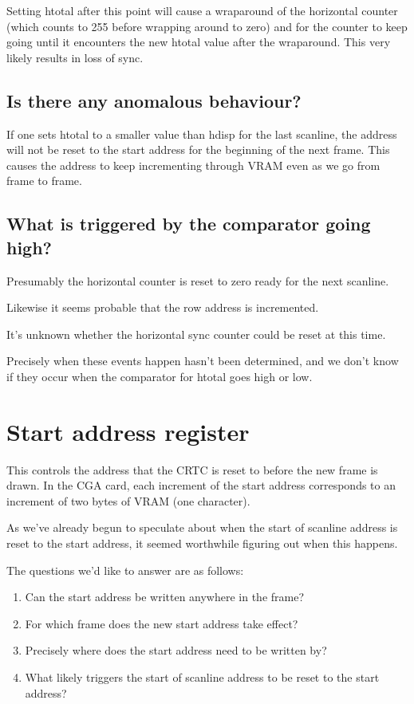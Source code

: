 \documentclass[a4paper,10pt]{amsart}
\begin{document}
Setting htotal after this point will cause a wraparound of the horizontal
counter (which counts to 255 before wrapping around to zero) and for the
counter to keep going until it encounters the new htotal value after the
wraparound. This very likely results in loss of sync.

\subsection{Is there any anomalous behaviour?}

If one sets htotal to a smaller value than hdisp for the last scanline, the
address will not be reset to the start address for the beginning of the next
frame. This causes the address to keep incrementing through VRAM even
as we go from frame to frame.

\subsection{What is triggered by the comparator going high?}

Presumably the horizontal counter is reset to zero ready for the next scanline.

Likewise it seems probable that the row address is incremented.

It's unknown whether the horizontal sync counter could be reset at this time.

Precisely when these events happen hasn't been determined, and we don't know
if they occur when the comparator for htotal goes high or low.

\section{Start address register}

This controls the address that the CRTC is reset to before the new frame is
drawn. In the CGA card, each increment of the start address corresponds to
an increment of two bytes of VRAM (one character).

As we've already begun to speculate about when the start of scanline address
is reset to the start address, it seemed worthwhile figuring out when this
happens.

The questions we'd like to answer are as follows:

\begin{enumerate}
\item Can the start address be written anywhere in the frame?
\item For which frame does the new start address take effect?
\item Precisely where does the start address need to be written by?
\item What likely triggers the start of scanline address to be reset to the start address?
\end{enumerate}
\end{document}
